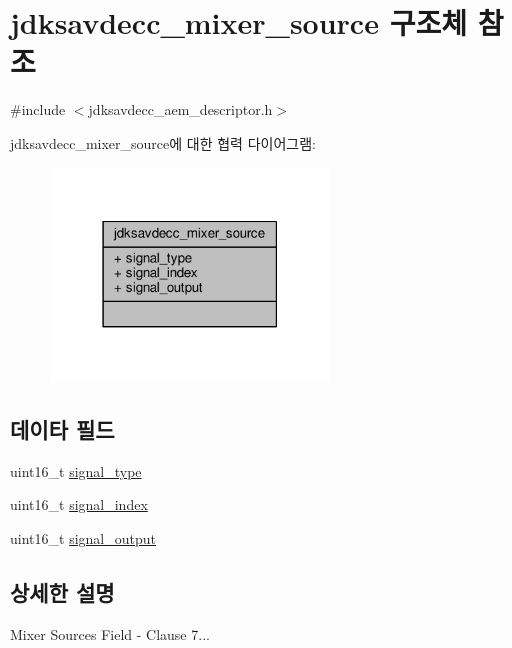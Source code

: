 \hypertarget{structjdksavdecc__mixer__source}{}\section{jdksavdecc\+\_\+mixer\+\_\+source 구조체 참조}
\label{structjdksavdecc__mixer__source}


{\ttfamily \#include $<$jdksavdecc\+\_\+aem\+\_\+descriptor.\+h$>$}



jdksavdecc\+\_\+mixer\+\_\+source에 대한 협력 다이어그램\+:
\nopagebreak
\begin{figure}[H]
\begin{center}
\leavevmode
\includegraphics[width=210pt]{structjdksavdecc__mixer__source__coll__graph}
\end{center}
\end{figure}
\subsection*{데이타 필드}
\begin{DoxyCompactItemize}
\item 
uint16\+\_\+t \hyperlink{structjdksavdecc__mixer__source_a248e60ef99d5ed1779989d1dd6b6dc5a}{signal\+\_\+type}
\item 
uint16\+\_\+t \hyperlink{structjdksavdecc__mixer__source_ae2e81a95ee9ad83f1fe22b6a1ee29075}{signal\+\_\+index}
\item 
uint16\+\_\+t \hyperlink{structjdksavdecc__mixer__source_ab4b91864e6fc335d7e86536d9f4461e4}{signal\+\_\+output}
\end{DoxyCompactItemize}


\subsection{상세한 설명}
Mixer Sources Field -\/ Clause 7... 

